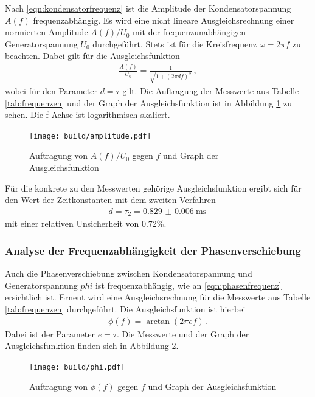 Nach \eqref{eqn:kondensatorfrequenz} ist die Amplitude der Kondensatorspannung
$A(f)$ frequenzabhängig. Es wird eine nicht lineare Ausgleichsrechnung
einer normierten Amplitude $A(f)/U_0$ mit der frequenzunabhängigen Generatorspannung $U_0$
durchgeführt. Stets ist für die Kreisfrequenz $\omega = 2πf$ zu beachten.
Dabei gilt für die Ausgleichsfunktion
\begin{align}
  \frac{A(f)}{U_0} = \frac{1}{\sqrt{1+(2πdf)^2}}\,,
\end{align}
wobei für den Parameter $d = \tau$ gilt.
Die Auftragung der Messwerte aus Tabelle \ref{tab:frequenzen} und der Graph der Ausgleichsfunktion ist in Abbildung \ref{fig:amplitude}
zu sehen. Die f-Achse ist logarithmisch skaliert.

\begin{figure}
  \centering
  \texttt{[image: build/amplitude.pdf]}
  \caption{Auftragung von $A(f)/U_0$ gegen $f$ und Graph der Ausgleichsfunktion}
  \label{fig:amplitude}
\end{figure}

Für die konkrete zu den Messwerten gehörige Ausgleichsfunktion ergibt sich für den Wert der Zeitkonstanten mit dem zweiten Verfahren
\begin{align}
  d = \tau_2 = \SI{0.829(0006)}{\milli\second}\,
\end{align}
mit einer relativen Unsicherheit von 0.72\%.

\subsubsection{Analyse der Frequenzabhängigkeit der Phasenverschiebung}

Auch die Phasenverschiebung zwischen Kondensatorspannung und Generatorspannung $phi$
ist frequenzabhängig, wie an \eqref{eqn:phasenfrequenz} ersichtlich ist.
Erneut wird eine Ausgleichsrechnung für die Messwerte aus Tabelle \ref{tab:frequenzen}
durchgeführt. Die Ausgleichsfunktion ist hierbei
\begin{align}
  \phi(f) = \arctan(2πef)\,.
\end{align}
Dabei ist der Parameter $e = \tau$. Die Messwerte und der Graph der Ausgleichsfunktion finden sich
in Abbildung \ref{fig:phiplot}.

\begin{figure}
  \centering
  \texttt{[image: build/phi.pdf]}
  \caption{Auftragung von $\phi(f)$ gegen $f$ und Graph der Ausgleichsfunktion}
  \label{fig:phiplot}
\end{figure}

